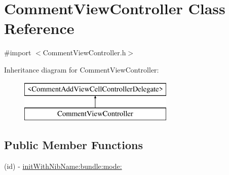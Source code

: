 \hypertarget{interface_comment_view_controller}{
\section{CommentViewController Class Reference}
\label{interface_comment_view_controller}
}


{\ttfamily \#import $<$CommentViewController.h$>$}

Inheritance diagram for CommentViewController:\begin{figure}[H]
\begin{center}
\leavevmode
\includegraphics[height=2.000000cm]{interface_comment_view_controller}
\end{center}
\end{figure}
\subsection*{Public Member Functions}
\begin{DoxyCompactItemize}
\item 
(id) -\/ \hyperlink{interface_comment_view_controller_adced6323f3b6910a54f12acfb93b893b}{initWithNibName:bundle:mode:}
\end{DoxyCompactItemize}
